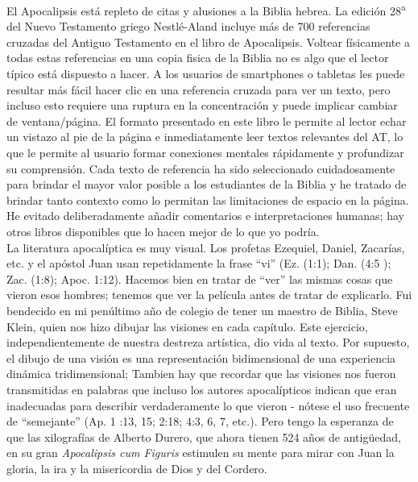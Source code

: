El Apocalipsis está repleto de citas y alusiones a la Biblia hebrea. La edición 28\textsuperscript{a} del Nuevo Testamento griego Nestlé-Aland incluye más de 700 referencias cruzadas del Antiguo Testamento en el libro de Apocalipsis. Voltear físicamente a todas estas referencias en una copia fisica de la Biblia no es algo que el lector típico está dispuesto a hacer. A los usuarios de smartphones o tabletas les puede resultar más fácil hacer clic en una referencia cruzada para ver un texto, pero incluso esto requiere una ruptura en la concentración y puede implicar cambiar de ventana/página. El formato presentado en este libro le permite al lector echar un vistazo al pie de la página e inmediatamente leer textos relevantes del AT, lo que le permite al usuario formar conexiones mentales rápidamente y profundizar su comprensión. Cada texto de referencia ha sido seleccionado cuidadosamente para brindar el mayor valor posible a los estudiantes de la Biblia y he tratado de brindar tanto contexto como lo permitan las limitaciones de espacio en la página. He evitado deliberadamente añadir comentarios e interpretaciones humanas; hay otros libros disponibles que lo hacen mejor de lo que yo podría.\\

La literatura apocalíptica es muy visual. Los profetas Ezequiel, Daniel, Zacarías, etc. y el apóstol Juan usan repetidamente la frase “vi” (Ez. (1:1); Dan. (4:5 ); Zac. (1:8); Apoc. 1:12). Hacemos bien en tratar de ``ver'' las mismas cosas que vieron esos hombres; tenemos que ver la película antes de tratar de explicarlo. Fui bendecido en mi penúltimo año de colegio de tener un maestro de Biblia, Steve Klein, quien nos hizo dibujar las visiones en cada capítulo. Este ejercicio, independientemente de nuestra destreza artística, dio vida al texto. Por supuesto, el dibujo de una visión es una representación bidimensional de una experiencia dinámica tridimensional; Tambien hay que recordar que las visiones nos fueron transmitidas en palabras que incluso los autores apocalípticos indican que eran inadecuadas para describir verdaderamente lo que vieron - nótese el uso frecuente de ``semejante'' (Ap. 1 :13, 15; 2:18; 4:3, 6, 7, etc.). Pero tengo la esperanza de que las xilografías de Alberto Durero, que ahora tienen 524 años de antigüedad, en su gran \textit{Apocalipsis cum Figuris} estimulen su mente para mirar con Juan la gloria, la ira y la misericordia de Dios y del Cordero.\\

